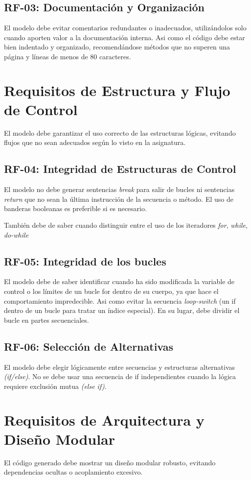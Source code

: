 \subsection{RF-03: Documentación y Organización}
El modelo debe evitar comentarios redundantes o inadecuados, utilizándolos solo cuando aporten valor a la documentación interna. Asi como el código debe estar bien indentado y organizado, recomendándose métodos que no superen una página y líneas de menos de 80 caracteres.

\section{Requisitos de Estructura y Flujo de Control}
El modelo debe garantizar el uso correcto de las estructuras lógicas, evitando flujos que no sean adecuados según lo visto en la asignatura.
\subsection{RF-04: Integridad de Estructuras de Control}
El modelo no debe generar sentencias \textit{break} para salir de bucles ni sentencias \textit{return} que no sean la última instrucción de la secuencia o método. El uso de banderas booleanas es preferible si es necesario.

También debe de saber cuando distinguir entre el uso de los iteradores \textit{for}, \textit{while}, \textit{do-while}

\subsection{RF-05: Integridad de los bucles}
El modelo debe de saber identificar cuando ha sido modificada la variable de control o los límites de un bucle for dentro de su cuerpo, ya que hace el comportamiento impredecible. Asi como  evitar la secuencia \textit{loop-switch} (un if dentro de un bucle para tratar un índice especial). En su lugar, debe dividir el bucle en partes secuenciales.

\subsection{RF-06: Selección de Alternativas}{
El modelo debe elegir lógicamente entre secuencias y estructuras alternativas \textit{(if/else)}. No se debe usar una secuencia de if independientes cuando la lógica requiere exclusión mutua \textit{(else if)}.
}

\section{Requisitos de Arquitectura y Diseño Modular}
El código generado debe mostrar un diseño modular robusto, evitando dependencias ocultas o acoplamiento excesivo.

